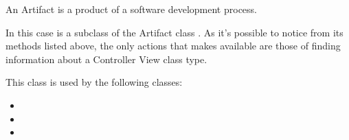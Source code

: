 An Artifact is a product of a software development process.

In this case  is a subclass of the Artifact class .
As it’s possible to notice from its methods listed above, the only actions that  makes available are those of finding information about a Controller View class type.

This class is used by the following classes:
\begin{itemize}
\item {}
\item {}
\item {}
\end{itemize}
